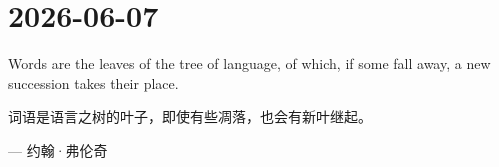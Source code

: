 \section*{2026-06-07}
Words are the leaves of the tree of language, of which, if some fall away, a new succession takes their place.\par
词语是语言之树的叶子，即使有些凋落，也会有新叶继起。\par
\hfill --- 约翰·弗伦奇 \par
